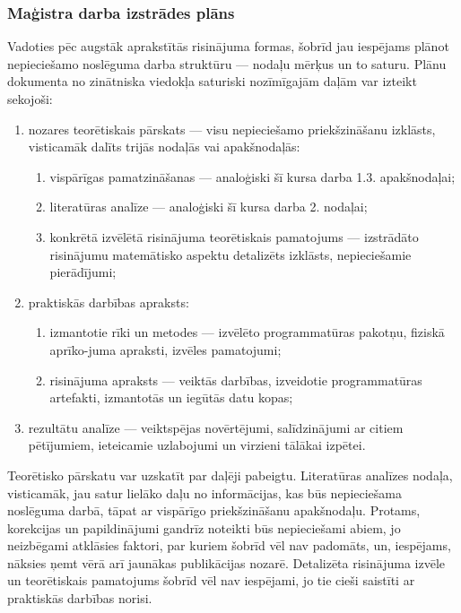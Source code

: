 \documentclass[12pt, a4paper]{article}
\numberwithin{equation}{section} %
\begin{document}
\subsubsection{Maģistra darba izstrādes plāns}

Vadoties pēc augstāk aprakstītās risinājuma formas, šobrīd jau iespējams plānot nepieciešamo noslēguma darba struktūru --- nodaļu mērķus un to saturu. Plānu dokumenta no zinātniska viedokļa saturiski nozīmīgajām daļām var izteikt sekojoši:

\begin{enumerate}
    \item nozares teorētiskais pārskats --- visu nepieciešamo priekšzināšanu izklāsts, visticamāk dalīts trijās nodaļās vai apakšnodaļās:
    \begin{enumerate}
        \item vispārīgas pamatzināšanas --- analoģiski šī kursa darba 1.3. apakšnodaļai;
        \item literatūras analīze --- analoģiski šī kursa darba 2. nodaļai;
        \item konkrētā izvēlētā risinājuma teorētiskais pamatojums --- izstrādāto risinājumu matemātisko aspektu detalizēts izklāsts, nepieciešamie pierādījumi;
    \end{enumerate}
    \item praktiskās darbības apraksts:
    \begin{enumerate}
        \item izmantotie rīki un metodes --- izvēlēto programmatūras pakotņu, fiziskā aprīko-juma apraksti, izvēles pamatojumi;
        \item risinājuma apraksts --- veiktās darbības, izveidotie programmatūras artefakti, izmantotās un iegūtās datu kopas;
    \end{enumerate}
    \item rezultātu analīze --- veiktspējas novērtējumi, salīdzinājumi ar citiem pētījumiem, ieteicamie uzlabojumi un virzieni tālākai izpētei.
\end{enumerate}

Teorētisko pārskatu var uzskatīt par daļēji pabeigtu. Literatūras analīzes nodaļa, visticamāk, jau satur lielāko daļu no informācijas, kas būs nepieciešama noslēguma darbā, tāpat ar vispārīgo priekšzināšanu apakšnodaļu. Protams, korekcijas un papildinājumi gandrīz noteikti būs nepieciešami abiem, jo neizbēgami atklāsies faktori, par kuriem šobrīd vēl nav padomāts, un, iespējams, nāksies ņemt vērā arī jaunākas publikācijas nozarē. Detalizēta risinājuma izvēle un teorētiskais pamatojums šobrīd vēl nav iespējami, jo tie cieši saistīti ar praktiskās darbības norisi.
\end{document}
